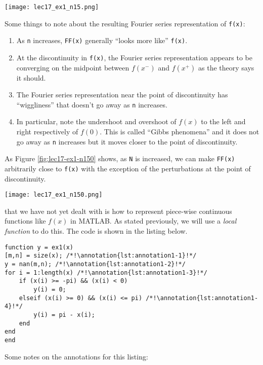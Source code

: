 \begin{marginfigure}
\texttt{[image: lec17\_ex1\_n15.png]}
\caption{Fourier series expansion with \lstinline{N=15}.}
\label{fig:lec17-ex1-n15}
\end{marginfigure} 
Some things to note about the resulting Fourier series representation of \lstinline{f(x)}:
\begin{enumerate}
\item As \lstinline{n} increases, \lstinline{FF(x)} generally ``looks more like'' \lstinline{f(x)}.  
\item At the discontinuity in \lstinline{f(x)}, the Fourier series representation appears to be converging on the midpoint between $f(x^-)$ and $f(x^+)$ as the theory says it should.
\item The Fourier series representation near the point of discontinuity has ``wiggliness'' that doesn't go away as \lstinline{n} increases.
\item In particular, note the undershoot and overshoot of $f(x)$ to the left and right respectively of $f(0)$.  This is called ``Gibbs phenomena'' and it does not go away as \lstinline{n} increases but it moves closer to the point of discontinuity.  
\end{enumerate}
As Figure \ref{fig:lec17-ex1-n150} shows, as \lstinline{N} is increased, we can make \lstinline{FF(x)} arbitrarily close to \lstinline{f(x)} with the exception of the perturbations at the point of discontinuity.
\begin{marginfigure}
\texttt{[image: lec17\_ex1\_n150.png]}
\caption{Fourier series expansion with \lstinline{N=150}.}
\label{fig:lec17-ex1-n150}
\end{marginfigure}

 that we have not yet dealt with is how to represent piece-wise continuous functions like $f(x)$ in MATLAB.  As stated previously, we will use a \emph{local function} to do this.  The code is shown in the listing below.

\begin{lstlisting}[name=lec17-ex1,style=myMatlab]
%% Local functions 
function y = ex1(x) 
[m,n] = size(x); /*!\annotation{lst:annotation1-1}!*/
y = nan(m,n); /*!\annotation{lst:annotation1-2}!*/
for i = 1:length(x) /*!\annotation{lst:annotation1-3}!*/
    if (x(i) >= -pi) && (x(i) < 0) 
        y(i) = 0;
    elseif (x(i) >= 0) && (x(i) <= pi) /*!\annotation{lst:annotation1-4}!*/
        y(i) = pi - x(i);
    end
end
end
\end{lstlisting} \setcounter{lstannotation}{0}
Some notes on the annotations for this listing:

